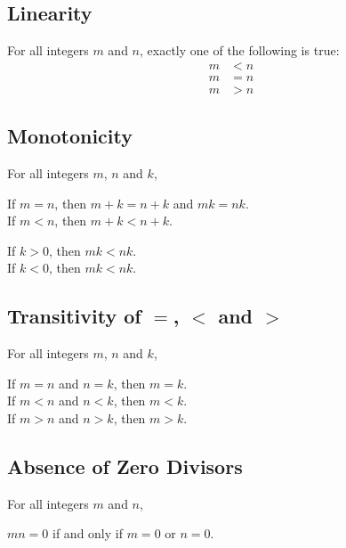 \documentclass[\main/notes.tex]{subfiles}
\begin{document}
			\subsection{Linearity}
				For all integers $m$ and $n$, exactly one of the following is true:
				\nopagebreak
				\begin{align*}
					m &< n\\
					m &= n\\
					m &> n
				\end{align*}
			\subsection{Monotonicity}
				For all integers $m$, $n$ and $k$,
				\nopagebreak
				\begin{indentparagraph}
					If $m = n$, then $m + k = n + k$ and $mk = nk$.\\
					If $m < n$, then $m + k < n + k$.
					\begin{indentparagraph}
						If $k > 0$, then $mk < nk$.\\
						If $k < 0$, then $mk < nk$.
					\end{indentparagraph}
				\end{indentparagraph}
			\subsection{Transitivity of \texorpdfstring{$=$}{=}, \texorpdfstring{$<$}{<} and \texorpdfstring{$>$}{>}}
				For all integers $m$, $n$ and $k$,
				\nopagebreak
				\begin{indentparagraph}
					If $m = n$ and $n = k$, then $m = k$.\\
					If $m < n$ and $n < k$, then $m < k$.\\
					If $m > n$ and $n > k$, then $m > k$.
				\end{indentparagraph}
			\subsection{Absence of Zero Divisors}
				For all integers $m$ and $n$,
				\nopagebreak
				\begin{indentparagraph}
					$mn = 0$ if and only if $m = 0$ or $n = 0$.
				\end{indentparagraph}
\end{document}
